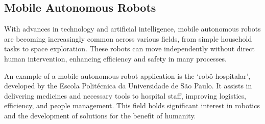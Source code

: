 \documentclass[../../monografia.tex]{subfiles}
\begin{document}
\subsection{Mobile Autonomous Robots}

With advances in technology and artificial intelligence, mobile autonomous robots are becoming increasingly common across various fields, from simple household tasks to space exploration. These robots can move independently without direct human intervention, enhancing efficiency and safety in many processes.

An example of a mobile autonomous robot application is the ‘robô hospitalar’, developed by the Escola Politécnica da Universidade de São Paulo. It assists in delivering medicines and necessary tools to hospital staff, improving logistics, efficiency, and people management. This field holds significant interest in robotics and the development of solutions for the benefit of humanity.
\end{document}
